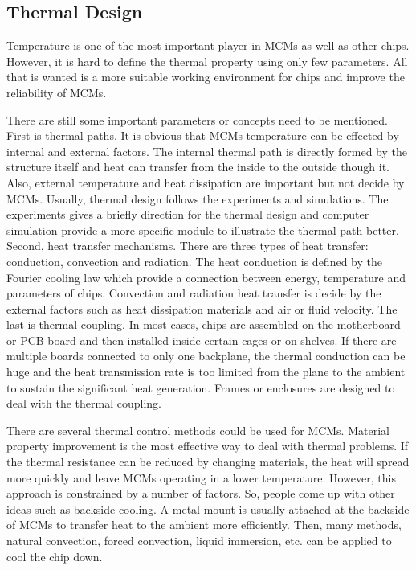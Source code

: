 \begin{spacing}{1.5}
\section{Thermal Design}

Temperature is one of the most important player in MCMs as well as other chips. However, it is hard to define the thermal property using only few parameters. All that is wanted is a more suitable working environment for chips and improve the reliability of MCMs. 

There are still some important parameters or concepts need to be mentioned. First is thermal paths. It is obvious that MCMs temperature can be effected by internal and external factors. The internal thermal path is directly formed by the structure itself and heat can transfer from the inside to the outside though it. Also, external temperature and heat dissipation are important but not decide by MCMs. Usually, thermal design follows the experiments and simulations. The experiments gives a briefly direction for the thermal design and computer simulation provide a more specific module to illustrate the thermal path better. Second, heat transfer mechanisms. There are three types of heat transfer: conduction, convection and radiation. The heat conduction is defined by the Fourier cooling law which provide a connection between energy, temperature and parameters of chips. Convection and radiation heat transfer is decide by the external factors such as heat dissipation materials and air or fluid velocity. The last is thermal coupling. In most cases, chips are assembled on the motherboard or PCB board and then installed inside certain cages or on shelves. If there are multiple boards connected to only one backplane, the thermal conduction can be huge and the heat transmission rate is too limited from the plane to the ambient to sustain the significant heat generation. Frames or enclosures are designed to deal with the thermal coupling. 

There are several thermal control methods could be used for MCMs. Material property improvement is the most effective way to deal with thermal problems. If the thermal resistance can be reduced by changing materials, the heat will spread more quickly and leave MCMs operating in a lower temperature. However, this approach is constrained by a number of factors. So, people come up with other ideas such as backside cooling. A metal mount is usually attached at the backside of MCMs to transfer heat to the ambient more efficiently. Then, many methods, natural convection, forced convection, liquid immersion, etc. can be applied to cool the chip down.


\end{spacing}
